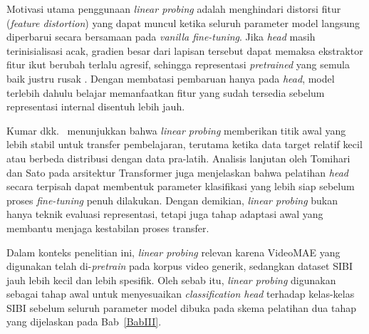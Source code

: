 Motivasi utama penggunaan \textit{linear probing} adalah menghindari distorsi fitur (\textit{feature distortion}) yang dapat muncul ketika seluruh parameter model langsung diperbarui secara bersamaan pada \textit{vanilla fine-tuning}. Jika \textit{head} masih terinisialisasi acak, gradien besar dari lapisan tersebut dapat memaksa ekstraktor fitur ikut berubah terlalu agresif, sehingga representasi \textit{pretrained} yang semula baik justru rusak \cite{Kumar2022}. Dengan membatasi pembaruan hanya pada \textit{head}, model terlebih dahulu belajar memanfaatkan fitur yang sudah tersedia sebelum representasi internal disentuh lebih jauh.\par

Kumar dkk.\ \cite{Kumar2022} menunjukkan bahwa \textit{linear probing} memberikan titik awal yang lebih stabil untuk transfer pembelajaran, terutama ketika data target relatif kecil atau berbeda distribusi dengan data pra-latih. Analisis lanjutan oleh Tomihari dan Sato \cite{Tomihari2024} pada arsitektur Transformer juga menjelaskan bahwa pelatihan \textit{head} secara terpisah dapat membentuk parameter klasifikasi yang lebih siap sebelum proses \textit{fine-tuning} penuh dilakukan. Dengan demikian, \textit{linear probing} bukan hanya teknik evaluasi representasi, tetapi juga tahap adaptasi awal yang membantu menjaga kestabilan proses transfer.\par

Dalam konteks penelitian ini, \textit{linear probing} relevan karena VideoMAE yang digunakan telah di-\textit{pretrain} pada korpus video generik, sedangkan dataset SIBI jauh lebih kecil dan lebih spesifik. Oleh sebab itu, \textit{linear probing} digunakan sebagai tahap awal untuk menyesuaikan \textit{classification head} terhadap kelas-kelas SIBI sebelum seluruh parameter model dibuka pada skema pelatihan dua tahap yang dijelaskan pada Bab~\ref{BabIII}.\par

